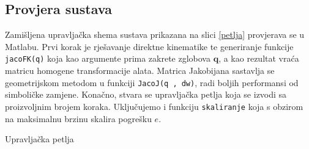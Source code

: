 \documentclass[times, utf8, diplomski, numeric]{fer}
\begin{document}
\subsection{Provjera sustava}\label{provjera}
Zamišljena upravljačka shema sustava prikazana na slici \ref{petlja} provjerava se u Matlabu.
Prvi korak je rješavanje direktne kinematike te generiranje funkcije \texttt{jacoFK(q)} koja kao argumente prima zakrete zglobova $\mathbf{q}$,
a kao rezultat vraća matricu homogene transformacije alata.
Matrica Jakobijana sastavlja se geometrijskom metodom u funkciji \texttt{JacoJ(q , dw)}, radi boljih performansi od simboličke zamjene.
Konačno, stvara se upravljačka petlja koja se izvodi sa proizvoljnim brojem koraka.  Uključujemo i funkciju \texttt{skaliranje} koja s obzirom na maksimalnu brzinu skalira pogrešku $e$.
\begin{algorithm}[H]
\caption{Upravljačka petlja}
\begin{algorithmic}
\ENDFOR
\end{algorithmic}
\end{algorithm}
\end{document}

